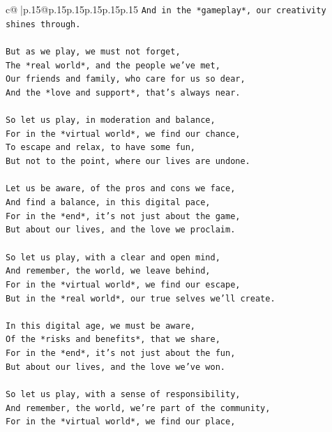\documentclass{article}
\begin{document}
{\begin{supertabular}{c@{$\;$}|p{.15\linewidth}@{}p{.15\linewidth}p{.15\linewidth}p{.15\linewidth}p{.15\linewidth}p{.15\linewidth}}
{{{\texttt{And in the *gameplay*, our creativity shines through.} \\
\\ 
\texttt{But as we play, we must not forget,} \\
\texttt{The *real world*, and the people we've met,} \\
\texttt{Our friends and family, who care for us so dear,} \\
\texttt{And the *love and support*, that's always near.} \\
\\ 
\texttt{So let us play, in moderation and balance,} \\
\texttt{For in the *virtual world*, we find our chance,} \\
\texttt{To escape and relax, to have some fun,} \\
\texttt{But not to the point, where our lives are undone.} \\
\\ 
\texttt{Let us be aware, of the pros and cons we face,} \\
\texttt{And find a balance, in this digital pace,} \\
\texttt{For in the *end*, it's not just about the game,} \\
\texttt{But about our lives, and the love we proclaim.} \\
\\ 
\texttt{So let us play, with a clear and open mind,} \\
\texttt{And remember, the world, we leave behind,} \\
\texttt{For in the *virtual world*, we find our escape,} \\
\texttt{But in the *real world*, our true selves we'll create.} \\
\\ 
\texttt{In this digital age, we must be aware,} \\
\texttt{Of the *risks and benefits*, that we share,} \\
\texttt{For in the *end*, it's not just about the fun,} \\
\texttt{But about our lives, and the love we've won.} \\
\\ 
\texttt{So let us play, with a sense of responsibility,} \\
\texttt{And remember, the world, we're part of the community,} \\
\texttt{For in the *virtual world*, we find our place,} \\
}}}
\end{supertabular}}
\end{document}
